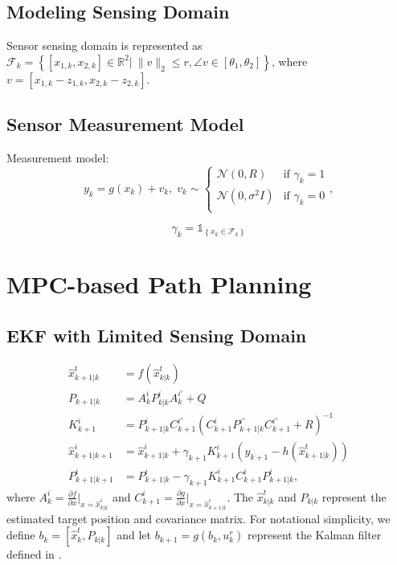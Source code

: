 \documentclass[letterpaper, 10 pt, conference]{ieeeconf}  %
\begin{document}
\subsection{Modeling Sensing Domain}
Sensor sensing domain is represented as $\mathcal{F}_k=\left\lbrace [x_{1,k},x_{2,k}]\in\mathbb{R}^2|\:\|v\|_2\leq r, \angle v\in[\theta_1,\theta_2]\right\rbrace$, where $v=[x_{1,k}-z_{1,k},x_{2,k}-z_{2,k}]$.

\subsection{Sensor Measurement Model}
Measurement model:
\begin{equation}\label{eqn:sensor}
y_{k}=g(x_k)+v_k,\;v_k\sim
\begin{cases}
\mathcal{N}(0,R) & \text{if } \gamma_k=1\\%
\mathcal{N}(0,\sigma^2 I) & \text{if } \gamma_k=0\\%
\end{cases},
\end{equation}

\begin{equation}
\label{eqn:gamma_indicator}
\gamma_{k}=\mathds{1}_{\left\lbrace x_{k}\in\mathcal{F}_{k}\right\rbrace}
\end{equation}

\section{MPC-based Path Planning}\label{sec:method}
\subsection{EKF with Limited Sensing Domain}\label{subseq:KF with FOV}
\begin{subequations}\label{eqn:KF}
	\begin{align}
	\hat{x}^t_{k+1|k}&=f(\hat{x}^t_{k|k})\\
	P_{k+1|k}&=A^i_kP^i_{k|k}A^{i'}_k+Q\\
	K^i_{k+1}&=P^i_{k+1|k}C^{i'}_{k+1}(C^i_{k+1}P^{i'}_{k+1|k}C^{i'}_{k+1}+R)^{-1}\\
	\hat{x}^i_{k+1|k+1}&=\hat{x}^i_{k+1|k}+\gamma_{k+1}K^i_{k+1}(y_{k+1}-h(\hat{x}^t_{k+1|k}))\label{eqn:KF_upd_x}\\
	P^i_{k+1|k+1}&=P^i_{k+1|k}-\gamma_{k+1}K^i_{k+1}C^i_{k+1}P^i_{k+1|k},
	\end{align}
\end{subequations}
where $A^i_k=\frac{\partial f}{\partial x}|_{x=\hat{x}^i_{k|k}}$ and $C^i_{k+1}=\frac{\partial g}{\partial x}|_{x=\hat{x}^i_{k+1|k}}$. 
The $\hat{x}^t_{k|k}$ and $P_{k|k}$ represent the estimated target position and covariance matrix.
For notational simplicity, we define $b_k=[\hat{x}^t_k,P_{k|k}]$ and let $b_{k+1}=g(b_k,u^r_k)$ represent the Kalman filter defined in .
\end{document}
